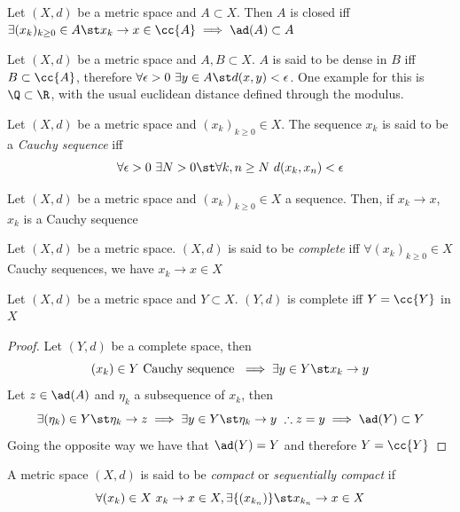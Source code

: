 \documentclass[../mmf.tex]{subfiles}
\begin{document}
\begin{prop}
	Let $(X,d)$ be a metric space and $A\subset X$. Then $A$ is closed iff $\exists(x_k)_{k\ge0}\in A\st x_k\to x\in\cc{A}\implies{}\ad(A)\subset A$
\end{prop}
\begin{dfn}
	Let $(X,d)$ be a metric space and $A,B\subset X$. $A$ is said to be dense in $B$ iff $B\subset\cc{A}$, therefore $\forall\epsilon>0\ \exists y\in A\st d(x,y)<\epsilon$. One example for this is $\Q\subset\R$, with the usual euclidean distance defined through the modulus.
\end{dfn}
\begin{dfn}
	Let $(X,d)$ be a metric space and $(x_k)_{k\ge0}\in X$. The sequence $x_k$ is said to be a \textit{Cauchy sequence} iff
	\begin{equation*}
		\forall\epsilon>0\ \exists N>0\st\forall k,n\ge N\ d(x_k,x_n)<\epsilon
	\end{equation*}
\end{dfn}
\begin{prop}
	Let $(X,d)$ be a metric space and $(x_k)_{k\ge0}\in X$ a sequence. Then, if $x_k\to x$, $x_k$ is a Cauchy sequence
\end{prop}
\begin{dfn}
	Let $(X,d)$ be a metric space. $(X,d)$ is said to be \textit{complete} iff $\forall(x_k)_{k\ge0}\in X$ Cauchy sequences, we have $x_k\to x\in X$
\end{dfn}
\begin{thm}[Completeness]
	Let $(X,d)$ be a metric space and $Y\subset X$. $(Y,d)$ is complete iff $Y=\cc{Y}$ in $X$
\end{thm}
\begin{proof}
	Let $(Y,d)$ be a complete space, then
	\begin{equation*}
		(x_k)\in Y\text{ Cauchy sequence }\implies{}\exists y\in Y\st x_k\to y
	\end{equation*}
	Let $z\in\ad(A)$ and $\eta_k$ a subsequence of $x_k$, then
	\begin{equation*}
		\exists(\eta_k)\in Y\st\eta_k\to z\implies{}\exists y\in Y\st\eta_k\to y\ \therefore z=y\implies{} \ad(Y)\subset Y
	\end{equation*}
	Going the opposite way we have that $\ad(Y)=Y$ and therefore $Y=\cc{Y}$
\end{proof}
\begin{dfn}
	A metric space $(X,d)$ is said to be \textit{compact} or \textit{sequentially compact} if
	\begin{equation*}
		\forall(x_k)\in X\ x_k\to x\in X, \exists\{(x_{k_n})\}\st x_{k_n}\to x\in X
	\end{equation*}
\end{dfn}
\end{document}
